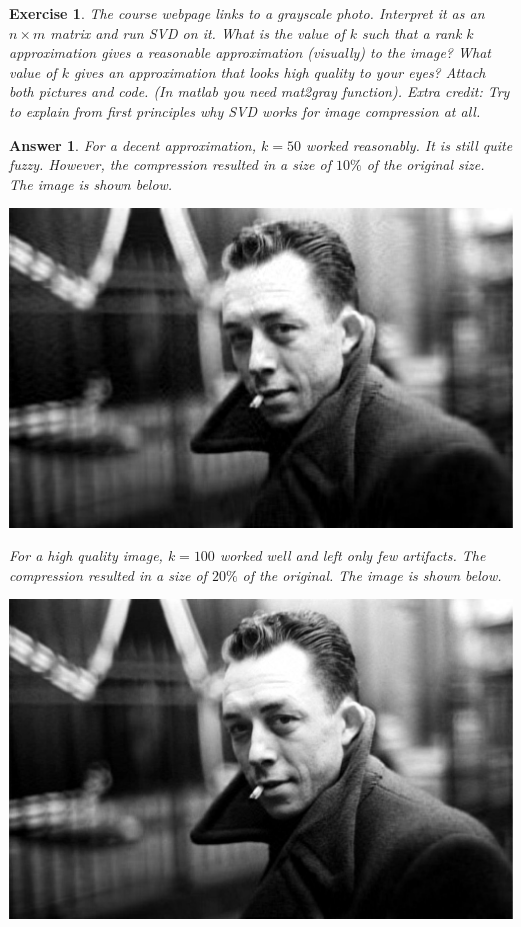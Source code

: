 \documentclass[12pt]{article}
\theoremstyle{colon}
\newtheorem{exercise}{Exercise}
\newtheorem*{answer}{Answer}
\begin{document}
\clearpage

\begin{exercise}
  The course webpage links to a grayscale photo. Interpret it as an $n \times m$ matrix and run SVD on it. What is the value of $k$ such that a rank $k$ approximation gives a reasonable approximation (visually) to the image? What value of $k$ gives an approximation that looks high quality to your eyes? Attach both pictures and code. (In matlab you need mat2gray function). Extra credit: Try to explain from first principles why SVD works for image compression at all.
\end{exercise}

\begin{answer}

  For a decent approximation, $k=50$ worked reasonably. It is still quite fuzzy. However, the compression resulted in a size of $10\%$ of the original size. The image is shown below.

  \includegraphics[width=\textwidth]{image_50}

  For a high quality image, $k=100$ worked well and left only few artifacts. The compression resulted in a size of $20\%$ of the original. The image is shown below.

  \includegraphics[width=\textwidth]{image_100}


\end{answer}
\end{document}
